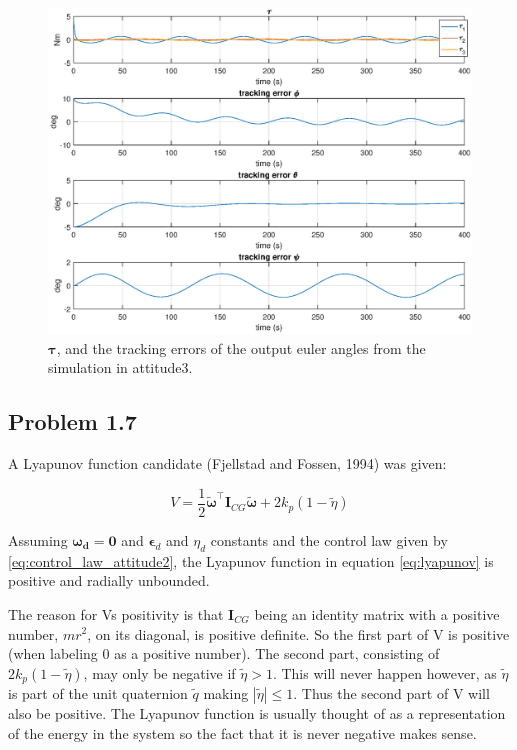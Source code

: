 \begin{figure}[!htb]
	\centering
	\includegraphics[width=1.00\textwidth]{figures/3_tau_track.eps}
	\caption{ $\boldsymbol{\tau}$, and the tracking errors of the output euler angles from the simulation in attitude3.}
\label{fig:sim_attitude3_track}
\end{figure}

\subsection*{Problem 1.7}

A Lyapunov function candidate (Fjellstad and Fossen, 1994) was given:

 \begin{equation}
	 V = \frac{1}{2} \tilde{\boldsymbol{\omega}}^{\top} \mathbf{I}_{CG}\tilde{\boldsymbol{\omega}} + 2 k_p (1-\tilde{\eta})
	 \label{eq:lyapunov}
 \end{equation}


Assuming $\boldsymbol{\omega_d }= \mathbf{0}$ and $\boldsymbol{\epsilon}_d$ and $\eta_d$ constants and the control law given by \eqref{eq:control_law_attitude2}, the Lyapunov function in equation \eqref{eq:lyapunov} is positive and radially unbounded. 

The reason for Vs positivity is that $\mathbf{I}_{CG}$ being an identity matrix with a positive number, $mr^2$, on its diagonal, is positive definite. So the first part of V is positive (when labeling 0 as a positive number). The second part, consisting of $2 k_p (1-\tilde{\eta})$, may only be negative if $\tilde{\eta} > 1$. This will never happen however, as $\tilde{\eta}$ is part of the unit quaternion $\tilde{q}$ making $|\tilde{\eta}| \leq 1$. Thus the second part of V will also be positive. The Lyapunov function is usually thought of as a representation of the energy in the system so the fact that it is never negative makes sense. 

